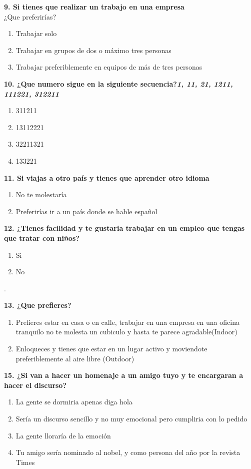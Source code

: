 \documentclass{article}
\begin{document}
\textbf{9. Si tienes que realizar un trabajo en una empresa }\\ 
¿Que preferirías?
\begin{enumerate}[label=(\Alph*)] 
\item Trabajar solo
\item Trabajar en grupos de dos o máximo tres personas
\item Trabajar preferiblemente en equipos de más de tres personas
 
\end{enumerate}

\textbf{10. ¿Que numero sigue en la siguiente secuencia?\emph{1, 11, 21, 1211, 111221, 312211} }
\begin{enumerate}[label=(\Alph*)] 
\item 311211
\item 13112221
\item 32211321
\item 133221
\end{enumerate}

\textbf{11. Si viajas a otro país y tienes que aprender otro idioma}
\begin{enumerate}[label=(\Alph*)] 
\item No te molestaría
\item Preferirías ir a un país donde se hable español
\end{enumerate}

\textbf{12. ¿Tienes facilidad y te gustaria trabajar en un empleo que tengas que tratar con niños?}
\begin{enumerate}[label=(\Alph*)]
\item Si
\item No 
\end{enumerate}.  

\textbf{13. ¿Que prefieres?}
\begin{enumerate}[label=(\Alph*)] 
\item Prefieres estar en casa o en calle, trabajar en una empresa en una oficina tranquilo no te molesta un cubiculo y hasta te parece agradable(Indoor)
\item Enloqueces y tienes que estar en un lugar activo y moviendote preferiblemente al aire libre (Outdoor)
\end{enumerate}
\pagebreak
\textbf{15. ¿Si van a hacer un homenaje a un amigo tuyo y te encargaran a hacer el discurso?}
\begin{enumerate}[label=(\Alph*)] 
\item La gente  se dormiria apenas diga hola
\item Sería un discurso sencillo y no muy emocional pero cumpliria con lo pedido
\item La gente lloraría de la emoción
\item Tu amigo sería nominado al nobel, y como persona del año por la revista Times
\end{enumerate}
\end{document}
